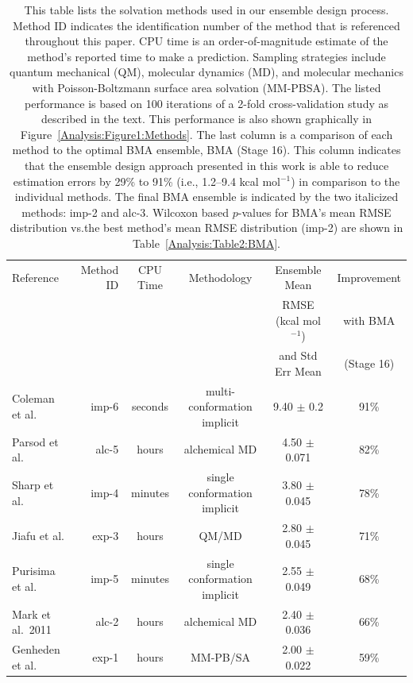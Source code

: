 \documentclass[journal=jpcbfk, manuscript=article]{achemso}
\newcommand{\+}[1]{\ensuremath{\mathbf{#1}}}
\newcommand{\rev}[1]{#1}
\begin{document}
\begin{table}[t]
	\centering
	\caption[Ensemble Constituents]{This table lists the solvation methods used in our ensemble design process.
	Method ID indicates the identification number of the method that is referenced throughout this paper.
	\rev{CPU time is an order-of-magnitude estimate of the method's reported time to make a prediction.}
	Sampling strategies include quantum mechanical (QM), molecular dynamics (MD), and molecular mechanics with Poisson-Boltzmann surface area solvation (MM-PBSA).
	The listed performance is based on 100 iterations of a 2-fold cross-validation study as described in the text.
	This performance is also shown graphically in Figure~\ref{Analysis:Figure1:Methods}.
	The last column is a comparison of each method to the optimal BMA ensemble, BMA (Stage 16).
	This column indicates that the ensemble design approach presented in this work is able to reduce estimation errors by 29\% to 91\% (i.e., 1.2--9.4 kcal mol$^{-1}$) in comparison to the individual methods.
	The final BMA ensemble is indicated by the two italicized methods: imp-2 and alc-3.
	Wilcoxon based $p$-values for BMA's mean RMSE distribution vs.\@ the best method's mean RMSE distribution (imp-2) are shown in Table~\ref{Analysis:Table2:BMA}.}
	\scriptsize
	\rev{
	\begin{tabular}{l|r|c|c|c|c}
		\hline
		\hline
		Reference 	& Method	ID & CPU Time & Methodology  &Ensemble Mean				& Improvement \\
					&  		&			&	& RMSE (kcal mol$^{-1}$)	& with BMA  \\
					& 			&		&		& and Std Err Mean	& (Stage 16) \\
		\hline
		Coleman et al.~\cite{Coleman:2014} & imp-6  & seconds & multi-conformation implicit & 9.40 $\pm$ 0.2 & 91\% \\
		Parsod et al. & alc-5 & hours & alchemical MD & 4.50 $\pm$ 0.071 & 82\% \\ 
		Sharp et al.~\cite{Yang:2006} & imp-4 &minutes& single conformation implicit & 3.80 $\pm$ 0.045 & 78\% \\
		Jiafu et al. & exp-3 &hours& QM/MD & 2.80 $\pm$ 0.045 & 71\% \\
		Purisima et al.~\cite{Hogues:2014} & imp-5&minutes  & single conformation implicit & 2.55 $\pm$ 0.049 & 68\%\\
		Mark et al.~2011 & alc-2 & hours&alchemical MD & 2.40 $\pm$ 0.036 & 66\%\\ 
		Genheden et al.~\cite{Genheden:2014} & exp-1&hours  & MM-PB/SA & 2.00 $\pm$ 0.022 & 59\%\\

\end{tabular}}
\end{table}
\end{document}
